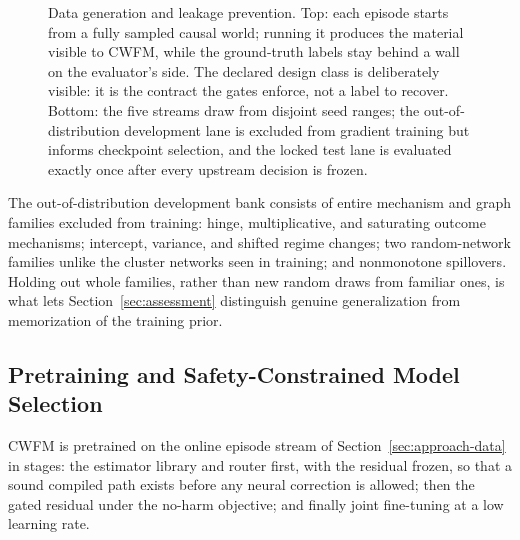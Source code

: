 \documentclass[electronics,article,submit,oneauthor]{Definitions/mdpi}
\providecommand{\Tiny}{\fontsize{6}{7}\selectfont}
\begin{document}
\begin{figure}[!t]
\caption{Data generation and leakage prevention. Top: each episode starts from a fully sampled causal world; running it produces the material visible to CWFM, while the ground-truth labels stay behind a wall on the evaluator's side. The declared design class is deliberately visible: it is the contract the gates enforce, not a label to recover. Bottom: the five streams draw from disjoint seed ranges; the out-of-distribution development lane is excluded from gradient training but informs checkpoint selection, and the locked test lane is evaluated exactly once after every upstream decision is frozen.}
\label{fig:streams}
\end{figure}


The out-of-distribution development bank consists of entire mechanism and graph families excluded from training: hinge, multiplicative, and saturating outcome mechanisms; intercept, variance, and shifted regime changes; two random-network families unlike the cluster networks seen in training; and nonmonotone spillovers. Holding out whole families, rather than new random draws from familiar ones, is what lets Section~\ref{sec:assessment} distinguish genuine generalization from memorization of the training prior.

\subsection{Pretraining and Safety-Constrained Model Selection}\label{sec:approach-training}

CWFM is pretrained on the online episode stream of Section~\ref{sec:approach-data} in stages: the estimator library and router first, with the residual frozen, so that a sound compiled path exists before any neural correction is allowed; then the gated residual under the no-harm objective; and finally joint fine-tuning at a low learning rate.
\end{document}

